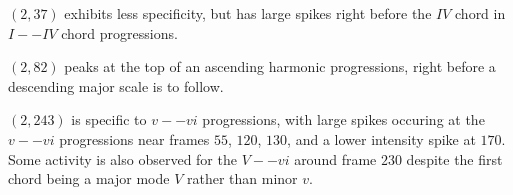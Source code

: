 \documentclass[dissertation.tex]{subfiles}
\begin{document}
$(2,37)$ exhibits less specificity, but has large spikes right before the $IV$ chord
in $I--IV$ chord progressions.

$(2,82)$ peaks at the top of an ascending harmonic progressions, right before a descending
major scale is to follow.

$(2, 243)$ is specific to $v -- vi$ progressions, with large spikes occuring at
the $v -- vi$ progressions near frames $55$, $120$, $130$, and a lower intensity spike at
$170$. Some activity is also observed for the $V -- vi$ around frame $230$ despite
the first chord being a major mode $V$ rather than minor $v$.


\printbibliography
\end{document}

